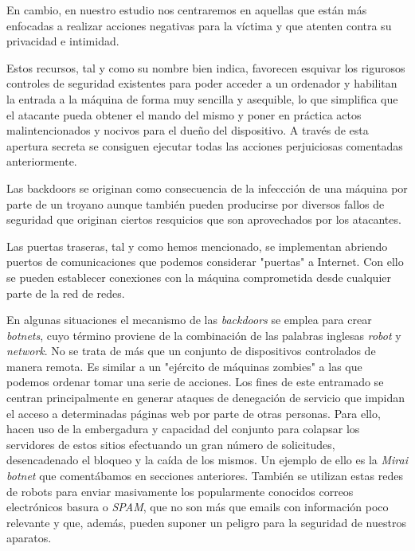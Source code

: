 \documentclass[12pt]{article}
\newcommand{\newpar} {
    \vskip 0.5cm
}
\begin{document}
            \newpar

            En cambio, en nuestro estudio nos centraremos en aquellas que están más enfocadas a realizar acciones negativas para la víctima y que atenten contra su privacidad e intimidad.

            \newpar

            Estos recursos, tal y como su nombre bien indica, favorecen esquivar los rigurosos controles de seguridad existentes para poder acceder a un ordenador y habilitan la entrada a la máquina de forma muy sencilla y asequible, lo que simplifica que el atacante pueda obtener el mando del mismo y poner en práctica actos malintencionados y nocivos para el dueño del dispositivo. A través de esta apertura secreta se consiguen ejecutar todas las acciones perjuiciosas comentadas anteriormente.

            \newpar

            Las backdoors se originan como consecuencia de la infeccción de una máquina por parte de un troyano aunque también pueden producirse por diversos fallos de seguridad que originan ciertos resquicios que son aprovechados por los atacantes.

            \newpar

            Las puertas traseras, tal y como hemos mencionado, se implementan abriendo puertos de comunicaciones que podemos considerar "puertas" a Internet. Con ello se pueden establecer conexiones con la máquina comprometida desde cualquier parte de la red de redes.

            \newpar

            En algunas situaciones el mecanismo de las \textit{backdoors} se emplea para crear \textit{botnets}, cuyo término proviene de la combinación de las palabras inglesas \textit{robot} y \textit{network}. No se trata de más que un conjunto de dispositivos controlados de manera remota. Es similar a un "ejército de máquinas zombies" a las que podemos ordenar tomar una serie de acciones. Los fines de este entramado se centran principalmente en generar ataques de denegación de servicio que impidan el acceso a determinadas páginas web por parte de otras personas. Para ello, hacen uso de la embergadura y capacidad del conjunto para colapsar los servidores de estos sitios efectuando un gran número de solicitudes, desencadenado el bloqueo y la caída de los mismos. Un ejemplo de ello es la \textit{Mirai botnet} que comentábamos en secciones anteriores. También se utilizan estas redes de robots para enviar masivamente los popularmente conocidos correos electrónicos basura o \textit{SPAM}, que no son más que emails con información poco relevante y que, además, pueden suponer un peligro para la seguridad de nuestros aparatos.
\end{document}

